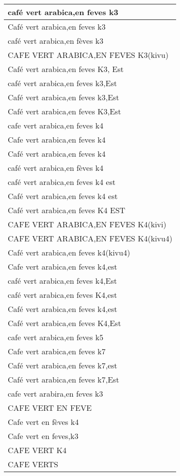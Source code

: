 \documentclass[
]{book}
\begin{document}
\begin{table}
\begin{tabular}[t]{l}
\hline
café vert arabica,en feves k3\\
\hline
Café vert arabica,en feves k3\\
\hline
café vert arabica,en fèves k3\\
\hline
CAFE VERT ARABICA,EN FEVES K3(kivu)\\
\hline
Café vert arabica,en feves K3, Est\\
\hline
café vert arabica,en feves k3,Est\\
\hline
Café vert arabica,en feves k3,Est\\
\hline
Café vert arabica,en feves K3,Est\\
\hline
cafe vert arabica,en feves k4\\
\hline
Cafe vert arabica,en feves k4\\
\hline
Café vert arabica,en feves k4\\
\hline
café vert arabica,en fèves k4\\
\hline
café vert arabica,en feves k4 est\\
\hline
Café vert arabica,en feves k4 est\\
\hline
Café vert arabica,en feves K4 EST\\
\hline
CAFE VERT ARABICA,EN FEVES K4(kivi)\\
\hline
CAFE VERT ARABICA,EN FEVES K4(kivu4)\\
\hline
Café vert arabica,en feves k4(kivu4)\\
\hline
Cafe vert arabica,en feves k4,est\\
\hline
café vert arabica,en feves k4,Est\\
\hline
café vert arabica,en feves K4,est\\
\hline
Café vert arabica,en feves k4,est\\
\hline
Café vert arabica,en feves K4,Est\\
\hline
cafe vert arabica,en feves k5\\
\hline
Cafe vert arabica,en feves k7\\
\hline
Café vert arabica,en feves k7,est\\
\hline
Café vert arabica,en feves k7,Est\\
\hline
cafe vert arabira,en feves k3\\
\hline
CAFE VERT EN FEVE\\
\hline
Cafe vert en fèves k4\\
\hline
Cafe vert en feves,k3\\
\hline
CAFE VERT K4\\
\hline
CAFE VERTS\\

\end{tabular}
\end{table}
\end{document}

